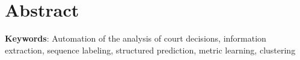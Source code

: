 \chapter*{Abstract}

\textbf{Keywords}: Automation of the analysis of court decisions, information extraction, sequence labeling, structured prediction, metric learning, clustering
